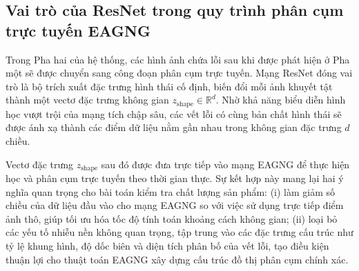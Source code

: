 \subsection{Vai trò của ResNet trong quy trình phân cụm trực tuyến EAGNG}

Trong Pha hai của hệ thống, các hình ảnh chứa lỗi sau khi được phát hiện ở Pha một sẽ được chuyển sang công đoạn phân cụm trực tuyến. Mạng ResNet đóng vai trò là bộ trích xuất đặc trưng hình thái cố định, biến đổi mỗi ảnh khuyết tật thành một vectơ đặc trưng không gian $z_{\text{shape}} \in \mathbb{R}^d$. Nhờ khả năng biểu diễn hình học vượt trội của mạng tích chập sâu, các vết lỗi có cùng bản chất hình thái sẽ được ánh xạ thành các điểm dữ liệu nằm gần nhau trong không gian đặc trưng $d$ chiều.

Vectơ đặc trưng $z_{\text{shape}}$ sau đó được đưa trực tiếp vào mạng EAGNG để thực hiện học và phân cụm trực tuyến theo thời gian thực. Sự kết hợp này mang lại hai ý nghĩa quan trọng cho bài toán kiểm tra chất lượng sản phẩm:
(i) làm giảm số chiều của dữ liệu đầu vào cho mạng EAGNG so với việc sử dụng trực tiếp điểm ảnh thô, giúp tối ưu hóa tốc độ tính toán khoảng cách không gian;
(ii) loại bỏ các yếu tố nhiễu nền không quan trọng, tập trung vào các đặc trưng cấu trúc như tỷ lệ khung hình, độ dốc biên và diện tích phân bố của vết lỗi, tạo điều kiện thuận lợi cho thuật toán EAGNG xây dựng cấu trúc đồ thị phân cụm chính xác.